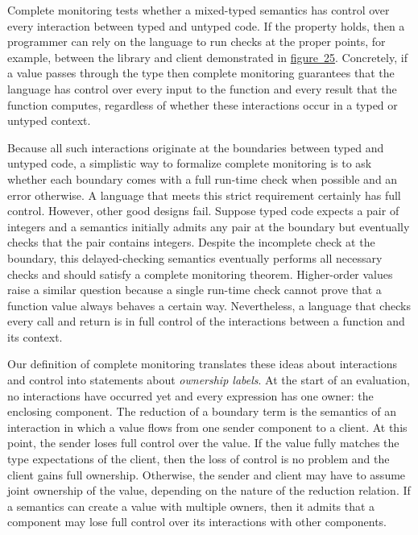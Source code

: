 \documentclass[ twoside,open=right,titlepage,numbers=noenddot,headinclude,%
                footinclude=true,cleardoublepage=empty,abstract=off,
                BCOR=5mm,paper=a4,fontsize=11pt,%
                ngerman,american,%
                parts,pdfspacing]{scrreprt}
\newcommand{\FigureRef}[2]{#1}
\begin{document}
Complete monitoring tests whether a mixed{-}typed semantics has control over
 every interaction between typed and untyped code.
If the property holds, then a programmer can rely on the language to run
 checks at the proper points, for example, between the library and client
 demonstrated in \hyperref[t:x28counter_x28x22figurex22_x22figx3atrx2dexamplex22x29x29]{figure~\FigureRef{25}{t:x28counter_x28x22figurex22_x22figx3atrx2dexamplex22x29x29}}.
Concretely, if a value passes through the type \relax{$(\tfun{\tint}{\tint})$}
 then complete monitoring guarantees that the language has control over
 every input to the function and every result that the function computes,
 regardless of whether these interactions occur in a typed or untyped context.

Because all such interactions originate at the boundaries
 between typed and untyped code,
 a simplistic way to formalize complete monitoring is to ask whether each
 boundary comes with a full run{-}time check when possible and an error otherwise.
A language that meets this strict requirement certainly has full control.
However, other good designs fail.
Suppose typed code expects a pair of integers and a semantics initially
 admits any pair at the boundary but eventually checks that the pair contains integers.
Despite the incomplete check at the boundary, this delayed{-}checking semantics eventually
 performs all necessary checks and should satisfy a complete monitoring theorem.
Higher{-}order values raise a similar question because a single run{-}time check
 cannot prove that a function value always behaves a certain way.
Nevertheless, a language that checks every call and return is in full control
 of the interactions between a function and its context.

Our definition of complete monitoring translates these ideas about
 interactions and control into statements about \emph{ownership labels}.
At the start of an evaluation, no interactions have occurred yet and every
 expression has one owner: the enclosing component.
The reduction of a boundary term is the semantics of an interaction in which
 a value flows from one sender component to a client.
At this point, the sender loses full control over the value.
If the value fully matches the type expectations of the client, then the loss
 of control is no problem and the client gains full ownership.
Otherwise, the sender and client may have to assume joint ownership of the value,
 depending on the nature of the reduction relation.
If a semantics can create a value with multiple owners, then it admits that
 a component may lose full control over its interactions with other components.
\end{document}
